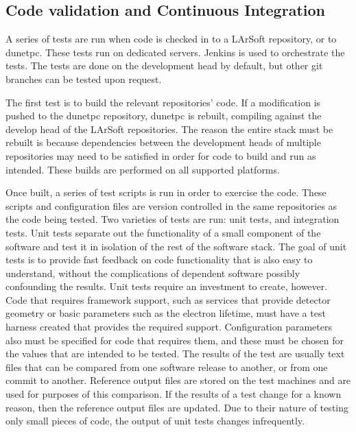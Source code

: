 \subsection{Code validation and Continuous Integration}

A series of tests are run when code is checked in to a LArSoft repository, or to dunetpc.  These tests run on
dedicated servers.  Jenkins is used to orchestrate the tests.  The tests are done on the development head by
default, but other git branches can be tested upon request.

The first test is to build the relevant repositories' code.  If a modification is pushed to the dunetpc repository,
dunetpc is rebuilt, compiling against the develop head of the LArSoft repositories.  The reason the entire stack
must be rebuilt is because dependencies between the development heads of multiple repositories may need to be
satisfied in order for code to build and run as intended.  These builds are performed on all supported platforms.

Once built, a series of test scripts is run in order to exercise the code.  These scripts and configuration files
are version controlled in the same repositories as the code being tested.  Two varieties of tests are run:
unit tests, and integration tests.  Unit tests separate out the functionality of a small component of the software
and test it in isolation of the rest of the software stack.  The goal of unit tests is to provide fast feedback
on code functionality that is also easy to understand, without the complications of dependent software possibly
confounding the results.  Unit tests require an investment to create, however.  Code that requires framework
support, such as services that provide detector geometry or basic parameters such as the electron lifetime, must
have a test harness created that provides the required support.  Configuration parameters also must be specified
for code that requires them, and these must be chosen for the values that are intended to be tested.  The results
of the test are usually text files that can be compared from one software release to another, or from one commit
to another.  Reference output files are stored on the test machines and are used for purposes of this comparison.
If the results of a test change for a known reason, then the reference output files are updated.  Due to their nature
of testing only small pieces of code, the output of unit tests changes infrequently.

